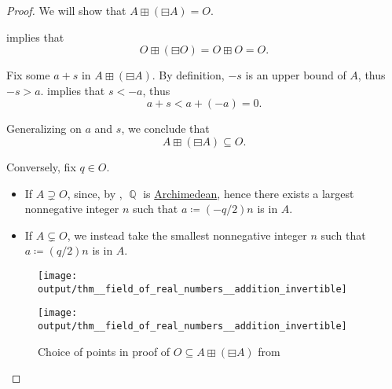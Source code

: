 \begin{proof}
   We will show that \( A \boxplus (\boxminus A) = O \).

    implies that
  \begin{equation*}
    O \boxplus (\boxminus O) = O \boxplus O = O.
  \end{equation*}

   Fix some \( a + s \) in \( A \boxplus (\boxminus A) \). By definition, \( -s \) is an upper bound of \( A \), thus \( -s > a \).  implies that \( s < -a \), thus
  \begin{equation*}
    a + s < a + (-a) = 0.
  \end{equation*}

  Generalizing on \( a \) and \( s \), we conclude that
  \begin{equation*}
    A \boxplus (\boxminus A) \subseteq O.
  \end{equation*}

  Conversely, fix \( q \in O \).

  \begin{itemize}
    \item If \( A \supsetneq O \), since, by , \( \BbbQ \) is \hyperref[def:archimedean_semiring]{Archimedean}, hence there exists a largest nonnegative integer \( n \) such that \( a \coloneqq (-q/2)n \) is in \( A \).

    \item If \( A \subsetneq O \), we instead take the smallest nonnegative integer \( n \) such that \( a \coloneqq (q/2)n \) is in \( A \).
  \end{itemize}

  \begin{figure}[!ht]
    \begin{subcaptionblock}{\textwidth}
      \centering
      \texttt{[image: output/thm\_\_field\_of\_real\_numbers\_\_addition\_invertible]}
    \end{subcaptionblock}

    \begin{subcaptionblock}{\textwidth}
      \centering
      \texttt{[image: output/thm\_\_field\_of\_real\_numbers\_\_addition\_invertible]}
    \end{subcaptionblock}

    \caption{Choice of points in proof of \( O \subseteq A \boxplus (\boxminus A) \) from }
    \label{fig:thm:field_of_real_numbers/addition_invertible}
  \end{figure}


\end{proof}
